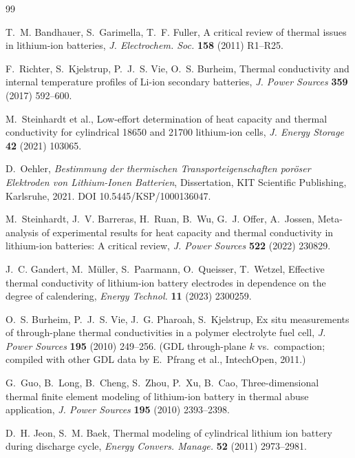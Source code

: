 \documentclass[10pt,a4paper]{article}
\begin{document}
\begin{thebibliography}{99}\small

T.~M. Bandhauer, S.~Garimella, T.~F. Fuller,
A critical review of thermal issues in lithium-ion batteries,
\emph{J. Electrochem. Soc.} \textbf{158} (2011) R1--R25.

F.~Richter, S.~Kjelstrup, P.~J.~S. Vie, O.~S. Burheim,
Thermal conductivity and internal temperature profiles of Li-ion secondary batteries,
\emph{J. Power Sources} \textbf{359} (2017) 592--600.

M.~Steinhardt et al.,
Low-effort determination of heat capacity and thermal conductivity for cylindrical 18650 and 21700 lithium-ion cells,
\emph{J. Energy Storage} \textbf{42} (2021) 103065.

D.~Oehler,
\emph{Bestimmung der thermischen Transporteigenschaften por\"oser Elektroden von Lithium-Ionen Batterien},
Dissertation, KIT Scientific Publishing, Karlsruhe, 2021. DOI 10.5445/KSP/1000136047.

M.~Steinhardt, J.~V. Barreras, H.~Ruan, B.~Wu, G.~J. Offer, A.~Jossen,
Meta-analysis of experimental results for heat capacity and thermal conductivity in lithium-ion batteries: A critical review,
\emph{J. Power Sources} \textbf{522} (2022) 230829.

J.~C. Gandert, M.~M\"uller, S.~Paarmann, O.~Queisser, T.~Wetzel,
Effective thermal conductivity of lithium-ion battery electrodes in dependence on the degree of calendering,
\emph{Energy Technol.} \textbf{11} (2023) 2300259.

O.~S. Burheim, P.~J.~S. Vie, J.~G. Pharoah, S.~Kjelstrup,
Ex situ measurements of through-plane thermal conductivities in a polymer electrolyte fuel cell,
\emph{J. Power Sources} \textbf{195} (2010) 249--256. (GDL through-plane $k$ vs.\ compaction; compiled with other GDL data by E.~Pfrang et al., IntechOpen, 2011.)

G.~Guo, B.~Long, B.~Cheng, S.~Zhou, P.~Xu, B.~Cao,
Three-dimensional thermal finite element modeling of lithium-ion battery in thermal abuse application,
\emph{J. Power Sources} \textbf{195} (2010) 2393--2398.

D.~H. Jeon, S.~M. Baek,
Thermal modeling of cylindrical lithium ion battery during discharge cycle,
\emph{Energy Convers. Manage.} \textbf{52} (2011) 2973--2981.


\end{thebibliography}
\end{document}
